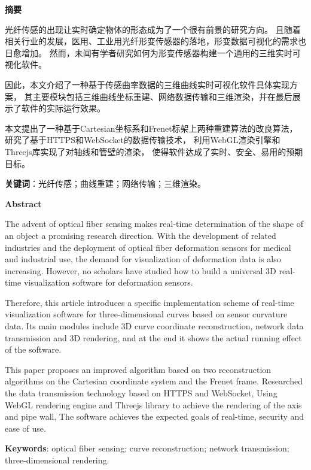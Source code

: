 \clearpage
\begin{center}
    \bfseries {} 摘要
\end{center}

光纤传感的出现让实时确定物体的形态成为了一个很有前景的研究方向。
且随着相关行业的发展，医用、工业用光纤形变传感器的落地，形变数据可视化的需求也日愈增加。
然而，未闻有学者研究如何为形变传感器构建一个通用的三维实时可视化软件。

因此，本文介绍了一种基于传感曲率数据的三维曲线实时可视化软件具体实现方案，
其主要模块包括三维曲线坐标重建、网络数据传输和三维渲染，并在最后展示了软件的实际运行效果。

本文提出了一种基于Cartesian坐标系和Frenet标架上两种重建算法的改良算法，
研究了基于HTTPS和WebSocket的数据传输技术，
利用WebGL渲染引擎和Threejs库实现了对轴线和管壁的渲染，
使得软件达成了实时、安全、易用的预期目标。

\textbf{关键词}：光纤传感；曲线重建；网络传输；三维渲染。

\clearpage{}

\begin{center}
    \bfseries {} Abstract
\end{center}

The advent of optical fiber sensing makes real-time determination of the shape of an object a promising research direction.
With the development of related industries and the deployment of optical fiber deformation sensors for medical and industrial use, the demand for visualization of deformation data is also increasing.
However, no scholars have studied how to build a universal 3D real-time visualization software for deformation sensors.

Therefore, this article introduces a specific implementation scheme of real-time visualization software for three-dimensional curves based on sensor curvature data.
Its main modules include 3D curve coordinate reconstruction, network data transmission and 3D rendering, and at the end it shows the actual running effect of the software.

This paper proposes an improved algorithm based on two reconstruction algorithms on the Cartesian coordinate system and the Frenet frame.
Researched the data transmission technology based on HTTPS and WebSocket,
Using WebGL rendering engine and Threejs library to achieve the rendering of the axis and pipe wall,
The software achieves the expected goals of real-time, security and ease of use.

\textbf{Keywords}: optical fiber sensing; curve reconstruction; network transmission; three-dimensional rendering.
